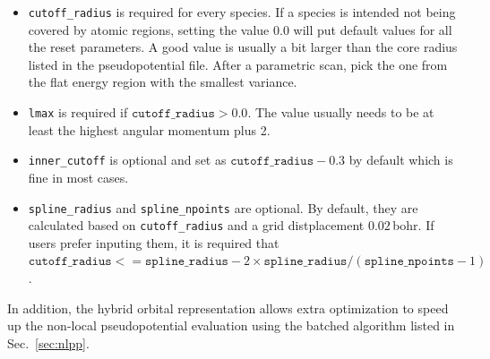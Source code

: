 \begin{itemize}
  \item \texttt{cutoff\_radius} is required for every species. If a species is intended not being covered by atomic regions, setting the value 0.0 will put default values for all the reset parameters. A good value is usually a bit larger than the core radius listed in the pseudopotential file. After a parametric scan, pick the one from the flat energy region with the smallest variance.
  \item \texttt{lmax} is required if $\texttt{cutoff\_radius} > 0.0$. The value usually needs to be at least the highest angular momentum plus 2.
  \item \texttt{inner\_cutoff} is optional and set as $\texttt{cutoff\_radius}-0.3$ by default which is fine in most cases.
  \item \texttt{spline\_radius} and \texttt{spline\_npoints} are optional. By default, they are calculated based on \texttt{cutoff\_radius} and a grid distplacement $0.02$\,bohr.
        If users prefer inputing them, it is required that $\texttt{cutoff\_radius}<=\texttt{spline\_radius}-2\times\texttt{spline\_radius}/(\texttt{spline\_npoints}-1)$.
\end{itemize}

In addition, the hybrid orbital representation allows extra optimization to speed up the non-local pseudopotential evaluation using the batched algorithm listed in Sec.~\ref{sec:nlpp}.
